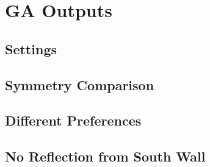 \section{GA Outputs}

\subsection{Settings}

\subsection{Symmetry Comparison}

\subsection{Different Preferences}

\subsection{No Reflection from South Wall}